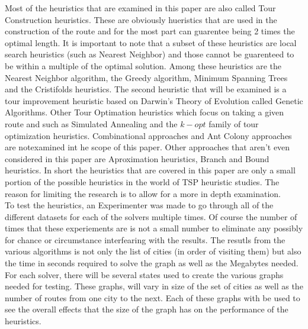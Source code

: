 \documentclass[midd]{thesis}
\newcommand{\tab}{\hspace*{2em}}
\begin{document}
\tab Most of the heuristics that are examined in this paper are also called Tour Construction heuristics. These are obviously hueristics that are used in the construction of the route and for the most part can guarentee being 2 times the optimal length. It is important to note that a subset of these heuristics are local search heuristics (such as Nearest Neighbor) and those cannot be guarenteed to be within a multiple of the optimal solution\cite{ttps}. Among these heuristics are the Nearest Neighbor algorithm, the Greedy algorithm, Minimum Spanning Trees and the Cristifolds heuristics. The second heuristic that will be examined is a tour improvement heuristic based on Darwin's Theory of Evolution called Genetic Algorithms. Other Tour Optimation heuristics which focus on taking a given route and such as Simulated Annealing and the $k-opt$ family of tour optimization heuristics. Combinational approaches and Ant Colony approaches are notexamined int he scope of this paper. Other approaches that aren't even considered in this paper are Aproximation heuristics, Branch and Bound heuristics. In short the heuristics that are covered in this paper are only a small portion of the possible heuristics in the world of TSP heuristic studies. The reason for limiting the research is to allow for a more in depth examination.\\
\tab To test the heuristics, an Experimenter was made to go through all of the different datasets for each of the solvers multiple times. Of course the number of times that these experiements are is not a small number to eliminate any possibly for chance or circumstance interfearing with the results. The resutls from the various algorithms is not only the list of cities (in order of visiting them) but also the time in seconds required to solve the graph as well as the Megabytes needed. For each solver, there will be several states used to create the various graphs needed for testing. These graphs, will vary in size of the set of cities as well as the number of routes from one city to the next. Each of these graphs with be used to see the overall effects that the size of the graph has on the performance of the heuristics.\\
\end{document}
